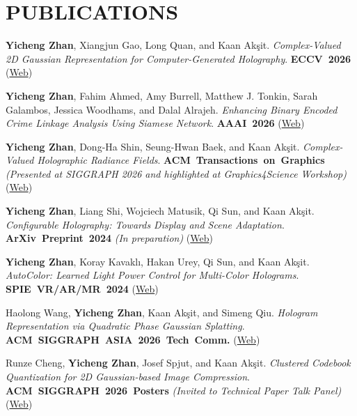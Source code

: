 \documentclass[10pt,a4paper]{article}
\begin{document}
\section*{PUBLICATIONS}
\begin{enumerate}[label={[\arabic*]}, leftmargin=*, before=\raggedright]
\item \textbf{Yicheng Zhan}, Xiangjun Gao, Long Quan, and Kaan Akşit. \textit{Complex-Valued 2D Gaussian Representation for Computer-Generated Holography}. \mbox{\textcolor{venue}{\textbf{ECCV 2026}}} (\href{https://complightlab.com/publications/complex_valued_2d_gaussians/}{Web})
\item \textbf{Yicheng Zhan}, Fahim Ahmed, Amy Burrell, Matthew J. Tonkin, Sarah Galambos, Jessica Woodhams, and Dalal Alrajeh. \textit{Enhancing Binary Encoded Crime Linkage Analysis Using Siamese Network}. \mbox{\textcolor{venue}{\textbf{AAAI 2026}}} (\href{https://ojs.aaai.org/index.php/AAAI/article/view/41309}{Web})
\item \textbf{Yicheng Zhan}, Dong-Ha Shin, Seung-Hwan Baek, and Kaan Akşit. \textit{Complex-Valued Holographic Radiance Fields}. \mbox{\textcolor{venue}{\textbf{ACM Transactions on Graphics}}} \textit{(Presented at SIGGRAPH 2026 and highlighted at Graphics4Science Workshop)} (\href{https://complightlab.com/publications/complex_valued_holographic_radiance_fields/}{Web})
\item \textbf{Yicheng Zhan}, Liang Shi, Wojciech Matusik, Qi Sun, and Kaan Akşit. \textit{Configurable Holography: Towards Display and Scene Adaptation}. \mbox{\textcolor{venue}{\textbf{ArXiv Preprint 2024}}} \textit{(In preparation)} (\href{https://arxiv.org/abs/2405.01558}{Web})
\item \textbf{Yicheng Zhan}, Koray Kavaklı, Hakan Urey, Qi Sun, and Kaan Akşit. \textit{AutoColor: Learned Light Power Control for Multi-Color Holograms}. \mbox{\textcolor{venue}{\textbf{SPIE VR/AR/MR 2024}}} (\href{https://complightlab.com/autocolor_/}{Web})
\item Haolong Wang, \textbf{Yicheng Zhan}, Kaan Akşit, and Simeng Qiu. \textit{Hologram Representation via Quadratic Phase Gaussian Splatting}. \mbox{\textcolor{venue}{\textbf{ACM SIGGRAPH ASIA 2026 Tech Comm.}}} (\href{https://gsmark36.github.io/complex-valued-quadratic-phase-gaussian/}{Web})
\item Runze Cheng, \textbf{Yicheng Zhan}, Josef Spjut, and Kaan Akşit. \textit{Clustered Codebook Quantization for 2D Gaussian-based Image Compression}. \mbox{\textcolor{venue}{\textbf{ACM SIGGRAPH 2026 Posters}}} \textit{(Invited to Technical Paper Talk Panel)} (\href{https://complightlab.com/publications/clustercodebook2DGS/}{Web})

\end{enumerate}
\end{document}
